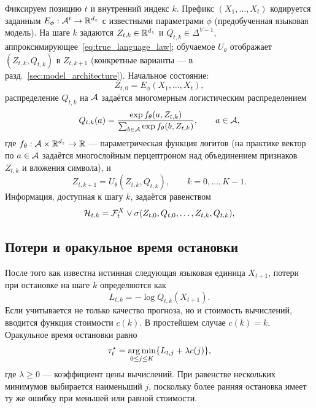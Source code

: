 Фиксируем позицию \(t\) и внутренний индекс \(k\). Префикс \((X_1,\ldots,X_t)\) кодируется
заданным \(E_{\phi}:\mathcal{A}^t\to\mathbb{R}^{d_z}\) с известными параметрами \(\phi\) (предобученная языковая
модель). На шаге \(k\) задаются \(Z_{t,k}\in\mathbb{R}^{d_z}\) и \(Q_{t,k}\in\Delta^{V-1}\),
аппроксимирующее~\eqref{eq:true_language_law}; обучаемое \(U_{\theta}\) отображает
\((Z_{t,k},Q_{t,k})\) в \(Z_{t,k+1}\) (конкретные варианты --- в
разд.~\ref{sec:model_architecture}). Начальное состояние:
\begin{equation}
  Z_{t,0}=E_{\phi}(X_1,\ldots,X_t),
  \label{eq:initial_state}
\end{equation}
распределение \(Q_{t,k}\) на \(\mathcal{A}\) задаётся многомерным логистическим распределением
\begin{equation}
  Q_{t,k}(a)=\frac{\exp f_{\theta}(a,Z_{t,k})}{\sum_{b\in\mathcal{A}}\exp f_{\theta}(b,Z_{t,k})}, \qquad
  a\in\mathcal{A},
  \label{eq:softmax_distribution}
\end{equation}
где \(f_{\theta}:\mathcal{A}\times\mathbb{R}^{d_z}\to\mathbb{R}\) --- параметрическая функция логитов (на практике вектор
по \(a\in\mathcal{A}\) задаётся многослойным перцептроном над объединением признаков \(Z_{t,k}\) и вложения
символа), и
\begin{equation}
  Z_{t,k+1}=U_{\theta}(Z_{t,k}, Q_{t,k}), \qquad k=0,\ldots,K-1.
  \label{eq:recursive_update}
\end{equation}
Информация, доступная к шагу \(k\), задаётся равенством
\begin{equation}
  \mathcal{H}_{t,k}=\mathcal{F}^X_t\vee\sigma(Z_{t,0},Q_{t,0},\ldots,Z_{t,k},Q_{t,k}),
  \label{eq:information_flow}
\end{equation}

\subsection{Потери и оракульное время остановки}

После того как известна истинная следующая языковая единица \(X_{t+1}\), потери при остановке на
шаге \(k\) определяются как
\begin{equation}
  L_{t,k}=-\log Q_{t,k}(X_{t+1}).
  \label{eq:nll_loss}
\end{equation}
Если учитывается не только качество прогноза, но и стоимость вычислений, вводится функция
стоимости \(c(k)\). В простейшем случае \(c(k)=k\). Оракульное время остановки равно
\begin{equation}
  \tau_t^\star=\operatorname*{arg\,min}_{0\le j\le K}\{L_{t,j}+\lambda c(j)\},
  \label{eq:oracle_stopping_time}
\end{equation}
где \(\lambda\ge0\) --- коэффициент цены вычислений. При равенстве нескольких минимумов выбирается
наименьший \(j\), поскольку более ранняя остановка имеет ту же ошибку при меньшей или равной
стоимости.

